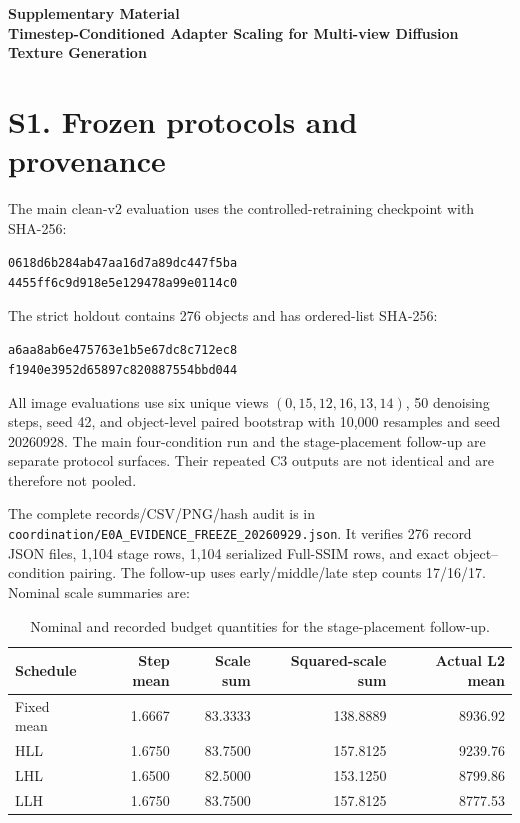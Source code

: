 \documentclass[10pt]{article}
\begin{document}
\begin{center}
{\Large\bfseries Supplementary Material}\\[4pt]
{\large\bfseries Timestep-Conditioned Adapter Scaling for Multi-view Diffusion Texture Generation}
\end{center}

\section{S1. Frozen protocols and provenance}

The main clean-v2 evaluation uses the controlled-retraining checkpoint with
SHA-256:
\begin{center}
\texttt{0618d6b284ab47aa16d7a89dc447f5ba}\\
\texttt{4455ff6c9d918e5e129478a99e0114c0}
\end{center}
The strict holdout contains 276 objects and has ordered-list SHA-256:
\begin{center}
\texttt{a6aa8ab6e475763e1b5e67dc8c712ec8}\\
\texttt{f1940e3952d65897c820887554bbd044}
\end{center}
All image evaluations use six unique views $(0,15,12,16,13,14)$, 50
denoising steps, seed 42, and object-level paired bootstrap with 10,000
resamples and seed 20260928. The main four-condition run and the
stage-placement follow-up are separate protocol surfaces. Their repeated C3
outputs are not identical and are therefore not pooled.

The complete records/CSV/PNG/hash audit is in
\texttt{coordination/E0A\_EVIDENCE\_FREEZE\_20260929.json}. It verifies 276
record JSON files, 1,104 stage rows, 1,104 serialized Full-SSIM rows, and
exact object--condition pairing. The follow-up uses early/middle/late step
counts 17/16/17. Nominal scale summaries are:

\begin{table}[h]
\centering\small
\caption{Nominal and recorded budget quantities for the stage-placement follow-up.}
\begin{tabular}{lrrrr}
\toprule
Schedule & Step mean & Scale sum & Squared-scale sum & Actual L2 mean \\
\midrule
Fixed mean & 1.6667 & 83.3333 & 138.8889 & 8936.92 \\
HLL & 1.6750 & 83.7500 & 157.8125 & 9239.76 \\
LHL & 1.6500 & 82.5000 & 153.1250 & 8799.86 \\
LLH & 1.6750 & 83.7500 & 157.8125 & 8777.53 \\
\bottomrule
\end{tabular}
\end{table}
\end{document}
